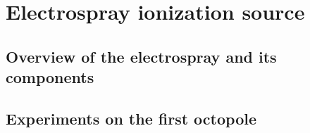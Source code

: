 \chapter{Electrospray ionization source}
\label{chap:ESI}

\section{Overview of the electrospray and its components}
\section{Experiments on the first octopole}